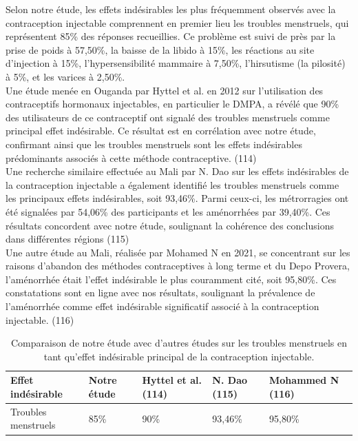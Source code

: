 \noindent Selon notre étude, les effets indésirables les plus fréquemment observés avec la contraception injectable comprennent en premier lieu les troubles menstruels, qui représentent 85\% des réponses recueillies. Ce problème est suivi de près par la prise de poids à 57,50\%, la baisse de la libido à 15\%, les réactions au site d'injection à 15\%, l'hypersensibilité mammaire à 7,50\%, l'hirsutisme (la pilosité) à 5\%, et les varices à 2,50\%. \\

\noindent Une étude menée en Ouganda par Hyttel et al. en 2012 sur l'utilisation des contraceptifs hormonaux injectables, en particulier le DMPA, a révélé que 90\% des utilisateurs de ce contraceptif ont signalé des troubles menstruels comme principal effet indésirable. Ce résultat est en corrélation avec notre étude, confirmant ainsi que les troubles menstruels sont les effets indésirables prédominants associés à cette méthode contraceptive. (114) \\

\noindent Une recherche similaire effectuée au Mali par N. Dao sur les effets indésirables de la contraception injectable a également identifié les troubles menstruels comme les principaux effets indésirables, soit 93,46\%. Parmi ceux-ci, les métrorragies ont été signalées par 54,06\% des participants et les aménorrhées par 39,40\%. Ces résultats concordent avec notre étude, soulignant la cohérence des conclusions dans différentes régions (115)\\

\noindent Une autre étude au Mali, réalisée par Mohamed N en 2021, se concentrant sur les raisons d'abandon des méthodes contraceptives à long terme et du Depo Provera, l'aménorrhée était l'effet indésirable le plus couramment cité, soit 95,80\%. Ces constatations sont en ligne avec nos résultats, soulignant la prévalence de l'aménorrhée comme effet indésirable significatif associé à la contraception injectable. (116) 

\begin{table}[H]
  \centering
  \renewcommand{\arraystretch}{1.5}

  \begin{spacing}{1.5} %
  \begin{tabularx}{\textwidth}{|X|X|X|X|p{3cm}|}
      \hline
      \textbf{Effet indésirable} & \textbf{Notre étude } & \textbf{Hyttel et al. (114)}& \textbf{N. Dao (115)} & \textbf{Mohammed N (116)}\\
      \hline
      Troubles \newline menstruels & 85\% & 90\% & 93,46\%  & 95,80\%\\
      
      
      \hline
  \end{tabularx}
\end{spacing}
\captionsetup{justification=centering} %
\caption{Comparaison de notre étude avec d’autres études sur les troubles menstruels en tant qu'effet indésirable principal de la contraception injectable.}

\end{table}

